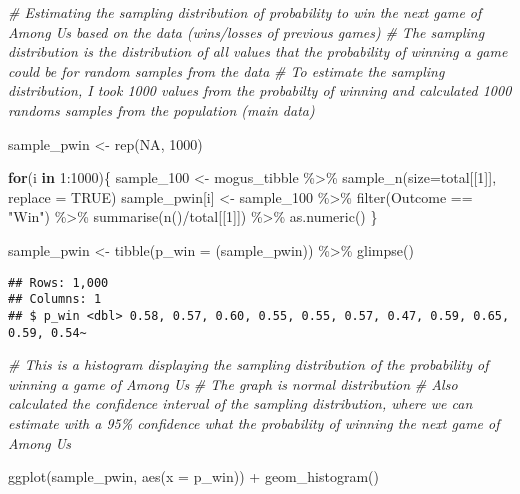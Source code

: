 \documentclass[
]{article}
\newenvironment{Shaded}{\begin{snugshade}}{\end{snugshade}}
\newcommand{\AttributeTok}[1]{\textcolor[rgb]{0.77,0.63,0.00}{#1}}
\newcommand{\CommentTok}[1]{\textcolor[rgb]{0.56,0.35,0.01}{\textit{#1}}}
\newcommand{\ConstantTok}[1]{\textcolor[rgb]{0.00,0.00,0.00}{#1}}
\newcommand{\ControlFlowTok}[1]{\textcolor[rgb]{0.13,0.29,0.53}{\textbf{#1}}}
\newcommand{\DecValTok}[1]{\textcolor[rgb]{0.00,0.00,0.81}{#1}}
\newcommand{\FunctionTok}[1]{\textcolor[rgb]{0.00,0.00,0.00}{#1}}
\newcommand{\NormalTok}[1]{#1}
\newcommand{\OtherTok}[1]{\textcolor[rgb]{0.56,0.35,0.01}{#1}}
\newcommand{\SpecialCharTok}[1]{\textcolor[rgb]{0.00,0.00,0.00}{#1}}
\newcommand{\StringTok}[1]{\textcolor[rgb]{0.31,0.60,0.02}{#1}}
\begin{document}
\begin{Shaded}
\begin{Highlighting}[]
\CommentTok{\# Estimating the sampling distribution of probability to win the next game of Among Us based on the data (wins/losses of previous games)}
\CommentTok{\# The sampling distribution is the distribution of all values that the probability of winning a game could be for random samples from the data}
\CommentTok{\# To estimate the sampling distribution, I took 1000 values from the probabilty of winning and calculated 1000 randoms samples from the population (main data)}

\NormalTok{sample\_pwin }\OtherTok{\textless{}{-}} \FunctionTok{rep}\NormalTok{(}\ConstantTok{NA}\NormalTok{, }\DecValTok{1000}\NormalTok{)}

\ControlFlowTok{for}\NormalTok{(i }\ControlFlowTok{in} \DecValTok{1}\SpecialCharTok{:}\DecValTok{1000}\NormalTok{)\{}
\NormalTok{  sample\_100 }\OtherTok{\textless{}{-}}\NormalTok{ mogus\_tibble }\SpecialCharTok{\%\textgreater{}\%} \FunctionTok{sample\_n}\NormalTok{(}\AttributeTok{size=}\NormalTok{total[[}\DecValTok{1}\NormalTok{]], }\AttributeTok{replace =} \ConstantTok{TRUE}\NormalTok{)}
\NormalTok{  sample\_pwin[i] }\OtherTok{\textless{}{-}}
\NormalTok{    sample\_100 }\SpecialCharTok{\%\textgreater{}\%}
    \FunctionTok{filter}\NormalTok{(Outcome }\SpecialCharTok{==} \StringTok{"Win"}\NormalTok{) }\SpecialCharTok{\%\textgreater{}\%}
    \FunctionTok{summarise}\NormalTok{(}\FunctionTok{n}\NormalTok{()}\SpecialCharTok{/}\NormalTok{total[[}\DecValTok{1}\NormalTok{]]) }\SpecialCharTok{\%\textgreater{}\%}
    \FunctionTok{as.numeric}\NormalTok{()}
\NormalTok{\}}

\NormalTok{sample\_pwin }\OtherTok{\textless{}{-}} \FunctionTok{tibble}\NormalTok{(}\AttributeTok{p\_win =}\NormalTok{ (sample\_pwin)) }\SpecialCharTok{\%\textgreater{}\%} \FunctionTok{glimpse}\NormalTok{()}
\end{Highlighting}
\end{Shaded}

\begin{verbatim}
## Rows: 1,000
## Columns: 1
## $ p_win <dbl> 0.58, 0.57, 0.60, 0.55, 0.55, 0.57, 0.47, 0.59, 0.65, 0.59, 0.54~
\end{verbatim}

\begin{Shaded}
\begin{Highlighting}[]
\CommentTok{\# This is a histogram displaying the sampling distribution of the probability of winning a game of Among Us}
\CommentTok{\# The graph is normal distribution }
\CommentTok{\# Also calculated the confidence interval of the sampling distribution, where we can estimate with a 95\% confidence what the probability of winning the next game of Among Us}

\FunctionTok{ggplot}\NormalTok{(sample\_pwin, }\FunctionTok{aes}\NormalTok{(}\AttributeTok{x =}\NormalTok{ p\_win)) }\SpecialCharTok{+} \FunctionTok{geom\_histogram}\NormalTok{()}
\end{Highlighting}
\end{Shaded}
\end{document}
